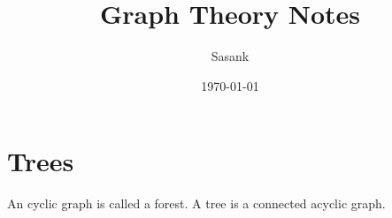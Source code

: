 \documentclass[a4paper]{article}
\begin{document}
\title{Graph Theory Notes}
\author{Sasank}
\date{\today}
\maketitle

\section{Trees}
An cyclic graph is called a forest. A tree is a connected acyclic graph.
\end{document}
